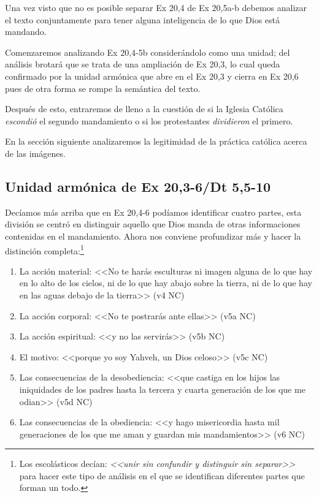 \documentclass{article}
\begin{document}
Una vez visto que no es posible separar Ex 20,4 de Ex 20,5a-b debemos analizar el texto conjuntamente para tener alguna inteligencia de lo que Dios est\'a mandando.

Comenzaremos analizando Ex 20,4-5b consider\'andolo como una unidad; del an\'alisis brotar\'a que se trata de una ampliaci\'on de Ex 20,3, lo cual queda confirmado por la unidad arm\'onica que abre en el Ex 20,3 y cierra en Ex 20,6 pues de otra forma se rompe la sem\'antica del texto.

Despu\'es de esto, entraremos de lleno a la cuesti\'on de si la Iglesia Cat\'olica \emph{escondi\'o} el segundo mandamiento o si los protestantes \emph{dividieron} el primero.

En la secci\'on siguiente analizaremos la legitimidad de la pr\'actica cat\'olica acerca de las im\'agenes.

\subsection{Unidad arm\'onica de Ex 20,3-6/Dt 5,5-10}

Dec\'{i}amos m\'as arriba que en Ex 20,4-6 pod\'{i}amos identificar cuatro partes, esta divisi\'on se centr\'o en distinguir aquello que Dios manda de otras informaciones contenidas en el mandamiento. Ahora nos conviene profundizar m\'as y hacer la distinci\'on completa:\footnote{Los escol\'asticos dec\'{i}an: \emph{<<unir sin confundir y distinguir sin separar>>} para hacer este tipo de an\'alisis en el que se identifican diferentes partes que forman un todo.}

\begin{enumerate}
\item La acci\'on material: <<No te har\'as esculturas ni imagen alguna de lo que hay en lo alto de los cielos, ni de lo que hay abajo sobre la tierra, ni de lo que hay en las aguas debajo de la tierra>> (v4 NC)
\item La acci\'on corporal: <<No te postrar\'as ante ellas>> (v5a NC)
\item La acci\'on espiritual: <<y no las servir\'as>> (v5b NC)
\item El motivo: <<porque yo soy Yahveh, un Dios celoso>> (v5c NC)
\item Las consecuencias de la desobediencia: <<que castiga en los hijos las iniquidades de los padres hasta la tercera y cuarta generaci\'on de los que me odian>> (v5d NC)
\item Las consecuencias de la obediencia: <<y hago misericordia hasta mil generaciones de los que me aman y guardan mis mandamientos>> (v6 NC)
\end{enumerate}
\end{document}
